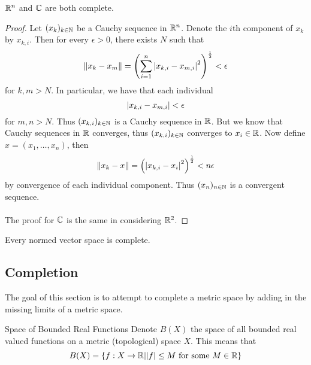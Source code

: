 \documentclass[a4paper]{article}
\begin{document}
\begin{prp}{}{} $\mathbb{R}^n$ and $\mathbb{C}$ are both complete. \tcbline
\begin{proof}
Let $(x_k)_{k\in\mathbb{N}}$ be a Cauchy sequence in $\mathbb{R}^n$. Denote the $i$th component of $x_k$ by $x_{k,i}$. Then for every $\epsilon>0$, there exists $N$ such that $$\|x_k-x_m\|=\left(\sum_{i=1}^n\abs{x_{k,i}-x_{m,i}}^2\right)^{\frac{1}{2}}<\epsilon$$ for $k,m>N$. In particular, we have that each individual $$\abs{x_{k,i}-x_{m,i}}<\epsilon$$ for $m,n>N$. Thus $(x_{k,i})_{k\in\mathbb{N}}$ is a Cauchy sequence in $\mathbb{R}$. But we know that Cauchy sequences in $\mathbb{R}$ converges, thus $(x_{k,i})_{k\in\mathbb{N}}$ converges to $x_i\in\mathbb{R}$. Now define $x=(x_1,\dots,x_n)$, then $$\|x_k-x\|=\left(\abs{x_{k,i}-x_i}^2\right)^{\frac{1}{2}}<n\epsilon$$ by convergence of each individual component. Thus $(x_n)_{n\in\mathbb{N}}$ is a convergent sequence. \\~\\
The proof for $\mathbb{C}$ is the same in considering $\mathbb{R}^2$. 
\end{proof}
\end{prp}

\begin{prp}{}{} Every normed vector space is complete. 
\end{prp}

\subsection{Completion}
The goal of this section is to attempt to complete a metric space by adding in the missing limits of a metric space. 

\begin{defn}{Space of Bounded Real Functions}{} Denote $B(X)$ the space of all bounded real valued functions on a metric (topological) space $X$. This means that $$B(X)=\{f:X\to\mathbb{R}|\abs{f}\leq M\text{ for some }M\in\mathbb{R}\}$$
\end{defn}
\end{document}
